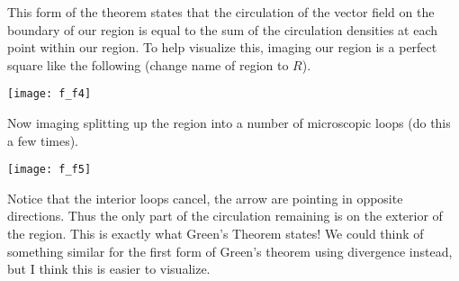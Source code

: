 \documentclass[12pt, letter]{article}
\theoremstyle{plain}
\numberwithin{theorem}{section}
\theoremstyle{definition}
\begin{document}
\bigskip

This form of the theorem states that the circulation of the vector field on the boundary of our region is equal to the sum of the circulation densities at each point within our region. To help visualize this, imaging our region is a perfect square like the following (change name of region to $R$).

\bigskip

\begin{center}
\texttt{[image: f\_f4]}
\end{center}

\bigskip

Now imaging splitting up the region into a number of microscopic loops (do this a few times).

\bigskip

\begin{center}
\texttt{[image: f\_f5]}
\end{center}

\bigskip

Notice that the interior loops cancel, the arrow are pointing in opposite directions. Thus the only part of the circulation remaining is on the exterior of the region. This is exactly what Green's Theorem states! We could think of something similar for the first form of Green's theorem using divergence instead, but I think this is easier to visualize.

\bigskip

\hrulefill

\bigskip
\end{document}
